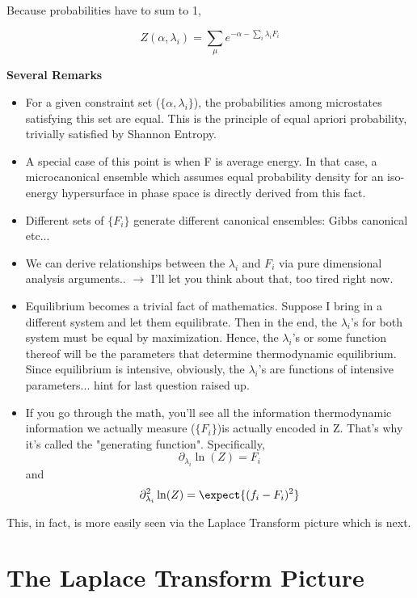 Because probabilities have to sum to 1, 

$$Z(\alpha, \lambda_i) = \sum_{\mu} e^{- \alpha - \sum_i \lambda_i F_i}$$

{\bf Several Remarks}

\begin{itemize}
\item For a given constraint set ($\{\alpha, \lambda_i \}$), the probabilities among microstates satisfying this set are equal.  This is the principle of equal apriori probability, trivially satisfied by Shannon Entropy. 

\item  A special case of this point is when F is average energy.  In that case, a microcanonical ensemble which assumes equal probability density for an iso-energy hypersurface in phase space is directly derived from this fact.

\item  Different sets of $\{F_i \}$ generate different canonical ensembles: Gibbs canonical etc...

\item We can derive relationships between the $\lambda_i$ and $F_i$ via pure dimensional analysis arguments.. $\rightarrow$ I'll let you think about that, too tired right now.

\item Equilibrium becomes a trivial fact of mathematics.  Suppose I bring in a different system and let them equilibrate.  Then in the end, the $\lambda_i$'s for both system must be equal by maximization.  Hence, the $\lambda_i$'s or some function thereof will be the parameters that determine thermodynamic equilibrium.  Since equilibrium is intensive, obviously, the $\lambda_i$'s are functions of intensive parameters... hint for last question raised up.

\item  If you go through the math, you'll see all the information thermodynamic information we actually measure ($\{F_i \}$)is actually encoded in Z.  That's why it's called the "generating function".  Specifically,
$$\partial_{\lambda_i} \ln(Z) = F_i$$
and 
$$\partial_{\lambda_i}^2 \ln(Z)= \expect{(f_i-F_i)^2}$$

\end{itemize}


This, in fact, is more easily seen via the Laplace Transform picture which is next.

\section{The Laplace Transform Picture}

